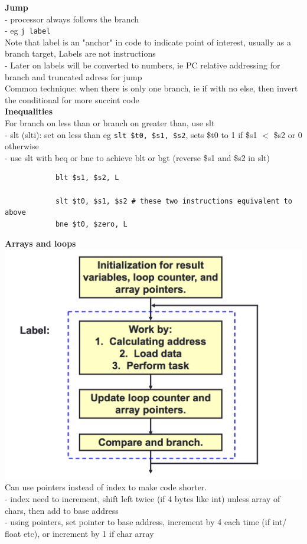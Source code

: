 \documentclass[10pt, a4paper]{article}
\begin{document}
\begin{multicols*}{3}
		\textbf{Jump}\\
		- processor always follows the branch\\
		- eg \texttt{j label}\\
		
		Note that label is an "anchor" in code to indicate point of interest, usually as a branch target, Labels are not instructions\\
		- Later on labels will be converted to numbers, ie PC relative addressing for branch and truncated adress for jump\\
		Common technique: when there is only one branch, ie if with no else, then invert the conditional for more succint code\\
		
		\textbf{Inequalities}\\
		For branch on less than or branch on greater than, use slt\\
		- slt (slti): set on less than eg \texttt{slt \$t0, \$s1, \$s2}, sets \$t0 to 1 if \$s1 $<$ \$s2 or 0 otherwise\\
		- use slt with beq or bne to achieve blt or bgt (reverse \$s1 and \$s2 in slt)
		\begin{verbatim}
			blt $s1, $s2, L
			
			slt $t0, $s1, $s2 # these two instructions equivalent to above
			bne $t0, $zero, L
		\end{verbatim}
		\textbf{Arrays and loops}\\
		\includegraphics[scale=0.3]{./assets/arrayFlowchart}\\
		Can use pointers instead of index to make code shorter. \\
		- index need to increment, shift left twice (if 4 bytes like int) unless array of chars, then add to base address\\
		- using pointers, set pointer to base address, increment by 4 each time (if int/ float etc), or increment by 1 if char array\\
		

\end{multicols*}
\end{document}
